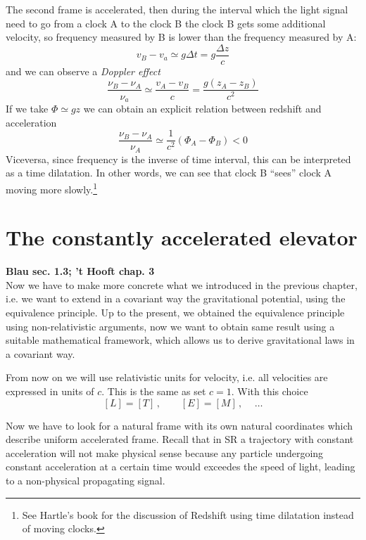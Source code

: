 \documentclass[../main/main.tex]{subfiles}
\begin{document}
The second frame is accelerated, then during the interval which the light signal need to go from a clock A to the clock B the clock B gets some additional velocity, so frequency measured by B is lower than the frequency measured by A:
\[v_B-v_a\simeq g\Delta t=g\frac{\Delta z}{c}\]
and we can observe a \emph{Doppler effect} 
\[\frac{\nu_B-\nu_A}{\nu_a}\simeq\frac{v_A-v_B}{c}=\frac{g(z_A-z_B)}{c^2}\]
If we take $\Phi\simeq gz$ we can obtain an explicit relation between redshift and acceleration
\[\frac{\nu_B-\nu_A}{\nu_A}\simeq\frac1{c^2}(\Phi_A-\Phi_B)<0\]
Viceversa, since frequency is the inverse of time interval, this can be interpreted as a time dilatation.
In other words, we can see that clock B ``sees'' clock A moving more slowly.\footnote{See Hartle's book for the discussion of Redshift using time dilatation instead of moving clocks.}



\section{The constantly accelerated elevator}
\textbf{Blau sec. 1.3; 't Hooft chap. 3}\\

Now we have to make more concrete what we introduced in the previous chapter, i.e. we want to extend in a covariant way the gravitational potential, using the equivalence principle. Up to the present, we obtained the equivalence principle using non-relativistic arguments, now we want to obtain same result using a suitable mathematical framework, which allows us to derive gravitational laws in a covariant way. 

From now on we will use relativistic units for velocity, i.e. all velocities are expressed in units of $c$. This is the same as set $c=1$. With this choice
\[[L]=[T]\,,\qquad [E]=[M]\,,\,\quad\dots\]

Now we have to look for a natural frame with its own natural coordinates which describe uniform accelerated frame. Recall that in SR a trajectory with constant acceleration will not make physical sense because any particle undergoing constant acceleration at a certain time would exceedes the speed of light, leading to a non-physical propagating signal. 
\end{document}
